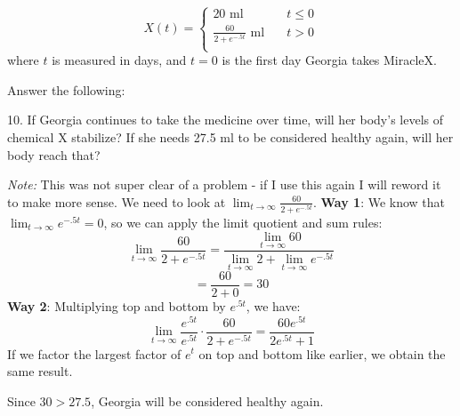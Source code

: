 \documentclass[fleqn]{article}
\begin{document}
\begin{equation*}
    X(t)=\begin{cases}
        20 \text{ ml} \quad & t\leq 0 \\
        \frac{60}{2+e^{-.5t}} \text{ ml} \quad & t > 0\\ 
         \end{cases}
\end{equation*}
where $t$ is measured in days, and $t=0$ is the first day Georgia takes MiracleX.


Answer the following:


10. If Georgia continues to take the medicine over time, will her body's levels of chemical X stabilize? 
If she needs 27.5 ml to be considered healthy again, will her body reach that? \linebreak   

\textit{Note:} This was not super clear of a problem - if I use this again I will reword it to make more sense.
We need to look at $\lim_{t\to\infty}\frac{60}{2+e^{-.5t}}$. \linebreak
\textbf{Way 1}:
We know that $\lim_{t\to\infty}e^{-.5t}=0$, so we can apply the limit quotient and sum rules:
\[\lim_{t\to\infty}\frac{60}{2+e^{-.5t}}=\frac{\lim_{t\to\infty}60}{\lim_{t\to\infty}2+\lim_{t\to\infty}e^{-.5t}}\]
\[=\frac{60}{2+0}=30\]
\textbf{Way 2}:
Multiplying top and bottom by $e^{.5t}$, we have:
\[\lim_{t\to\infty}\frac{e^{.5t}}{e^{.5t}}\cdot\frac{60}{2+e^{-.5t}}=\frac{60e^{.5t}}{2e^{.5t}+1}\]
If we factor the largest factor of $e^{t}$ on top and bottom like earlier, we obtain the same result.\linebreak

Since $30>27.5$, Georgia will be considered healthy again.
\end{document}
